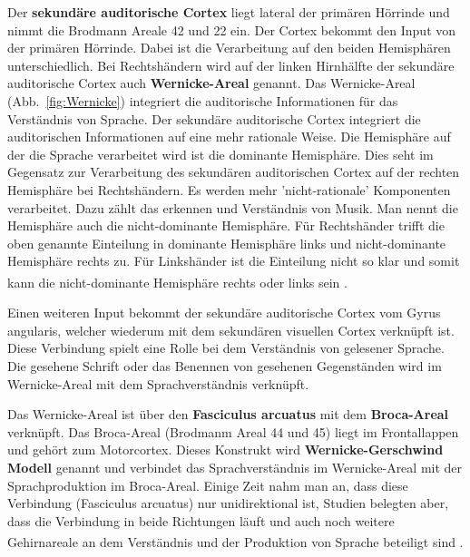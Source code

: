 \documentclass[12pt,a4paper,pdftex]{article}
\begin{document}
Der \textbf{sekundäre auditorische Cortex}  liegt lateral der primären Hörrinde und nimmt die Brodmann Areale 42 und 22 ein. Der Cortex bekommt den Input von der primären Hörrinde. Dabei ist die Verarbeitung auf den beiden Hemisphären unterschiedlich. Bei Rechtshändern wird auf der linken Hirnhälfte der sekundäre auditorische Cortex auch \textbf{Wernicke-Areal}  genannt. Das Wernicke-Areal (Abb.~\ref{fig:Wernicke}) integriert die auditorische Informationen für das Verständnis von Sprache. Der sekundäre auditorische Cortex integriert die auditorischen Informationen auf eine mehr rationale Weise. Die Hemisphäre auf der die Sprache verarbeitet wird ist die dominante Hemisphäre. Dies seht im Gegensatz zur Verarbeitung des sekundären auditorischen Cortex auf der rechten Hemisphäre bei Rechtshändern. Es werden mehr 'nicht-rationale' Komponenten verarbeitet. Dazu zählt das erkennen und Verständnis von Musik. Man nennt die Hemisphäre auch die nicht-dominante Hemisphäre. Für Rechtshänder trifft die oben genannte Einteilung in dominante Hemisphäre links und nicht-dominante Hemisphäre rechts zu. Für Linkshänder ist die Einteilung nicht so klar und somit kann die nicht-dominante Hemisphäre rechts oder links sein \textsuperscript{\cite{trepel2011neuroanatomie}}.

Einen weiteren Input bekommt der sekundäre auditorische Cortex vom Gyrus angularis, welcher wiederum mit dem sekundären visuellen Cortex verknüpft ist. Diese Verbindung spielt eine Rolle bei dem Verständnis von gelesener Sprache. Die gesehene Schrift oder das Benennen von gesehenen Gegenständen wird im Wernicke-Areal mit dem Sprachverständnis verknüpft. 

Das Wernicke-Areal ist über den \textbf{Fasciculus arcuatus}  mit dem \textbf{Broca-Areal}  verknüpft. Das Broca-Areal (Brodmanm Areal 44 und 45) liegt im Frontallappen und gehört zum Motorcortex. Dieses Konstrukt wird \textbf{Wernicke-Gerschwind Modell}  genannt und verbindet das Sprachverständnis im Wernicke-Areal mit der Sprachproduktion im Broca-Areal. Einige Zeit nahm man an, dass diese Verbindung (Fasciculus arcuatus) nur unidirektional ist, Studien belegten aber, dass die Verbindung in beide Richtungen läuft und auch noch weitere Gehirnareale an dem Verständnis und der Produktion von Sprache beteiligt sind \textsuperscript{\cite[60]{kandel2013principles}}.
\end{document}
